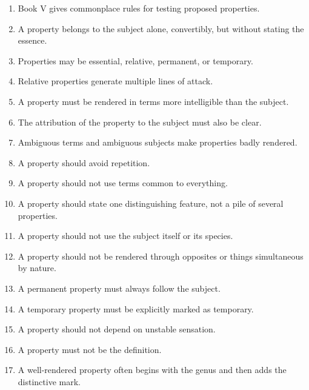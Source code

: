 \documentclass[12pt]{article}
\begin{document}
\begin{enumerate}[itemsep=0.5em]
    \item Book V gives commonplace rules for testing proposed properties.

    \item A property belongs to the subject alone, convertibly, but without
    stating the essence.

    \item Properties may be essential, relative, permanent, or temporary.

    \item Relative properties generate multiple lines of attack.

    \item A property must be rendered in terms more intelligible than the
    subject.

    \item The attribution of the property to the subject must also be clear.

    \item Ambiguous terms and ambiguous subjects make properties badly rendered.

    \item A property should avoid repetition.

    \item A property should not use terms common to everything.

    \item A property should state one distinguishing feature, not a pile of
    several properties.

    \item A property should not use the subject itself or its species.

    \item A property should not be rendered through opposites or things
    simultaneous by nature.

    \item A permanent property must always follow the subject.

    \item A temporary property must be explicitly marked as temporary.

    \item A property should not depend on unstable sensation.

    \item A property must not be the definition.

    \item A well-rendered property often begins with the genus and then adds the
    distinctive mark.


\end{enumerate}
\end{document}
